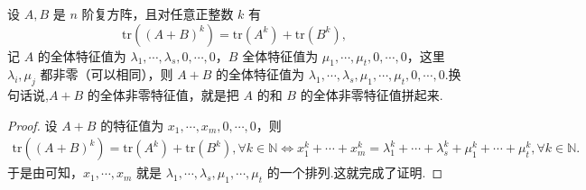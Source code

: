 \documentclass[../../main.tex]{subfiles}%
\begin{document}
\begin{proposition}\label{proposition:命题24}
设 $A,B$ 是 $n$ 阶复方阵，且对任意正整数 $k$ 有 $$\mathrm{tr}((A+B)^k)=\mathrm{tr}(A^k)+\mathrm{tr}(B^k),$$记 $A$ 的全体特征值为 $\lambda_1,\cdots,\lambda_s,0,\cdots,0$，$B$ 全体特征值为 $\mu_1,\cdots,\mu_t,0,\cdots,0$，这里 $\lambda_i,\mu_j$ 都非零（可以相同），则 $A+B$ 的全体特征值为 $\lambda_1,\cdots,\lambda_s,\mu_1,\cdots,\mu_t,0,\cdots,0$.换句话说,$A+B$ 的全体非零特征值，就是把 $A$ 的和 $B$ 的全体非零特征值拼起来.
\end{proposition}
\begin{proof}
设 $A+B$ 的特征值为 $x_1,\cdots ,x_m,0,\cdots ,0$，则
\begin{align*}
\mathrm{tr}\left( \left( A+B \right) ^k \right) =\mathrm{tr}\left( A^k \right) +\mathrm{tr}\left( B^k \right) ,\forall k\in \mathbb{N} 
\Longleftrightarrow x_{1}^{k}+\cdots +x_{m}^{k}=\lambda _{1}^{k}+\cdots +\lambda _{s}^{k}+\mu _{1}^{k}+\cdots +\mu _{t}^{k},\forall k\in \mathbb{N} .
\end{align*}
于是由可知，$x_1,\cdots ,x_m$ 就是 $\lambda _1,\cdots ,\lambda _s,\mu _1,\cdots ,\mu _t$ 的一个排列.这就完成了证明.
\end{proof}
\end{document}
